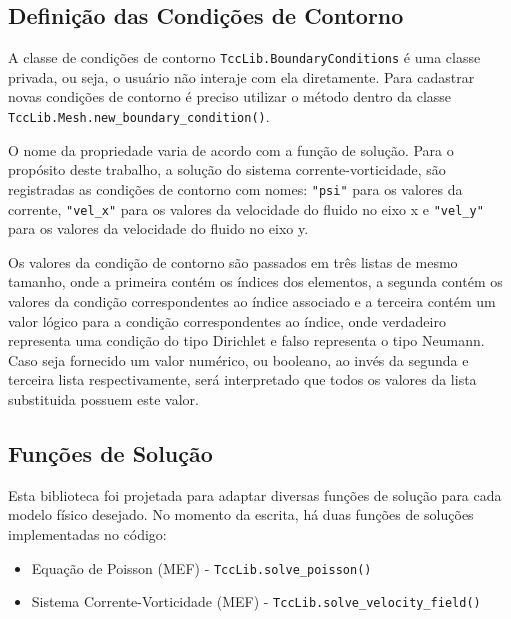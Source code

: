 \subsection{\textbf{Definição das Condições de Contorno}}
A classe de condições de contorno \verb|TccLib.BoundaryConditions| é uma classe privada, ou seja, o usuário não interaje com ela diretamente.
Para cadastrar novas condições de contorno é preciso utilizar o método dentro da classe \verb|TccLib.Mesh.new_boundary_condition()|.

O nome da propriedade varia de acordo com a função de solução.
Para o propósito deste trabalho, a solução do sistema corrente-vorticidade, são registradas as condições de contorno com nomes: \verb|"psi"| para os valores da corrente, \verb|"vel_x"| para os valores da velocidade do fluido no eixo x e  \verb|"vel_y"| para os valores da velocidade do fluido no eixo y.

Os valores da condição de contorno são passados em três listas de mesmo tamanho, onde a primeira contém os índices dos elementos, a segunda contém os valores da condição correspondentes ao índice associado e a terceira contém um valor lógico para a condição correspondentes ao índice, onde verdadeiro representa uma condição do tipo Dirichlet e falso representa o tipo Neumann.
Caso seja fornecido um valor numérico, ou booleano, ao invés da segunda e terceira lista respectivamente, será interpretado que todos os valores da lista substituida possuem este valor.

\subsection{\textbf{Funções de Solução}}
Esta biblioteca foi projetada para adaptar diversas funções de solução para cada modelo físico desejado.
No momento da escrita, há duas funções de soluções implementadas no código:
\begin{itemize}
    \item Equação de Poisson (MEF) - \verb|TccLib.solve_poisson()|
    \item Sistema Corrente-Vorticidade (MEF) - \verb|TccLib.solve_velocity_field()|
\end{itemize}

